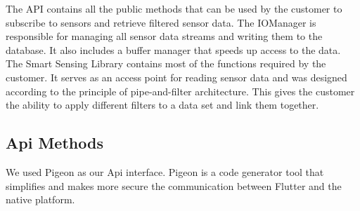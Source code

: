\documentclass[12pt]{article}
\begin{document}
The API contains all the public methods that can be used by the customer to subscribe to sensors and retrieve filtered sensor data. The IOManager is responsible for managing all sensor data streams and writing them to the database. It also includes a buffer manager that speeds up access to the data. The Smart Sensing Library contains most of the functions required by the customer. It serves as an access point for reading sensor data and was designed according to the principle of pipe-and-filter architecture. This gives the customer the ability to apply different filters to a data set and link them together. 



\subsection{Api Methods}
We used Pigeon as our Api interface. Pigeon is a code generator tool that simplifies and makes more secure the communication between Flutter and the native platform.
\end{document}
